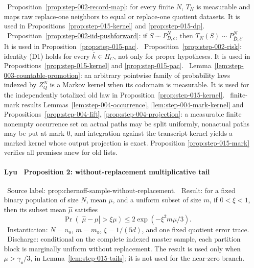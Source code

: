 \noindent\textbullet\ Proposition~\ref{prop:step-002-record-map}: for every finite
  \(N\), \(T_N\) is measurable and maps raw replace-one neighbors to equal
  or replace-one quotient datasets. It is used in
  Propositions~\ref{prop:step-015-kernel} and \ref{prop:step-015-dp}.
\noindent\textbullet\ Proposition~\ref{prop:step-002-iid-pushforward}: if
  \(S\sim P_{D,c}^N\), then
  \(T_N(S)\sim P_{\bar D,\bar c}^N\). It is used in
  Proposition~\ref{prop:step-015-pac}.
\noindent\textbullet\ Proposition~\ref{prop:step-002-risk}: identity (D1) holds for
  every \(\bar h\in H_C\), not only for proper hypotheses. It is used in
  Propositions~\ref{prop:step-015-kernel} and \ref{prop:step-015-pac}.
\noindent\textbullet\ Lemma~\ref{lem:step-003-countable-promotion}: an arbitrary
  pointwise family of probability laws indexed by \(Z_Q^N\) is a Markov
  kernel when its codomain is measurable. It is used for the independently
  totalized old law in Proposition~\ref{prop:step-015-kernel}.
\noindent\textbullet\ finite-mark results
  Lemmas~\ref{lem:step-004-occurrence},
  \ref{lem:step-004-mark-kernel} and
  Propositions~\ref{prop:step-004-lift},
  \ref{prop:step-004-projection}: a measurable finite nonempty occurrence
  set on actual paths may be split uniformly, nonactual paths may be put at
  mark \(0\), and integration against the transcript kernel yields a marked
  kernel whose output projection is exact. Proposition
  \ref{prop:step-015-mark} verifies all premises anew for old lists.

\paragraph{Lyu~\citep{lyu2025} Proposition 2: without-replacement multiplicative tail}

\noindent\textbullet\ Source label: prop:chernoff-sample-without-replacement.
\noindent\textbullet\ Result: for a fixed binary population of size \(N\), mean
  \(\mu\), and a uniform subset of size \(m\), if
  \(0<\xi<1\), then its subset mean \(\widehat\mu\) satisfies
  \[
  \Pr(|\widehat\mu-\mu|>\xi\mu)
  \le2\exp(-\xi^2m\mu/3).
  \tag{C1}
  \]
\noindent\textbullet\ Instantiation: \(N=n_{\mathrm o}\), \(m=m_{\mathrm o}\),
  \(\xi=1/(5d)\), and one fixed quotient error trace.
\noindent\textbullet\ Discharge: conditional on the complete indexed master sample, each
  partition block is marginally uniform without replacement. The result is
  used only when \(\mu>\gamma_{\mathrm o}/3\), in
  Lemma~\ref{lem:step-015-tails}; it is not used for the near-zero branch.

